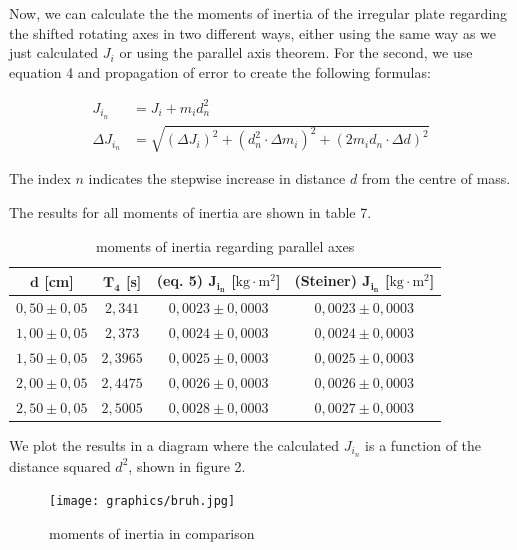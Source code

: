 \documentclass{article}
\begin{document}
Now, we can calculate the the moments of inertia of the irregular plate regarding the shifted rotating axes in two different ways, either using the same way as we just calculated $J_i$ or using the parallel axis theorem. For the second, we use equation 4 and propagation of error to create the following formulas:

\begin{equation}
\begin{split}
    J_{i_n} &= J_i + m_i d_n^2 \\
    \Delta J_{i_n} &= \sqrt{(\Delta J_i)^2 + (d_n^2 \cdot \Delta m_i)^2 + (2m_id_n \cdot \Delta d)^2}
\end{split}
\end{equation}

The index $n$ indicates the stepwise increase in distance $d$ from the centre of mass.

The results for all moments of inertia are shown in table 7.

\begin{table}[!ht]
    \centering
    \begin{tabular}{c|c|c|c}
        $\bm{d}$ [cm] & $\bm{T_4}$ [s] & \textbf{(eq. 5)} $\bm{J_{i_n}}$ [$\text{kg} \cdot \text{m}^2$] & \textbf{(Steiner)} $\bm{J_{i_n}}$ [$\text{kg} \cdot \text{m}^2$] \\ \hline
        $0,50 \pm 0,05$ & $2,341$ & $0,0023 \pm 0,0003$ & $0,0023 \pm 0,0003$ \\ 
        $1,00 \pm 0,05$ & $2,373$ & $0,0024 \pm 0,0003$ & $0,0024 \pm 0,0003$ \\ 
        $1,50 \pm 0,05$ & $2,3965$ & $0,0025 \pm 0,0003$ & $0,0025 \pm 0,0003$ \\ 
        $2,00 \pm 0,05$ & $2,4475$ & $0,0026 \pm 0,0003$ & $0,0026 \pm 0,0003$ \\ 
        $2,50 \pm 0,05$ & $2,5005$ & $0,0028 \pm 0,0003$ & $0,0027 \pm 0,0003$ \\ 
    \end{tabular}
    \caption{moments of inertia regarding parallel axes}
    \bigskip
\end{table}

We plot the results in a diagram where the calculated ${J_{i_n}}$ is a function of the distance squared $d^2$, shown in figure 2.

\begin{figure} [!hb]
    \centering
    \texttt{[image: graphics/bruh.jpg]}
    \caption{moments of inertia in comparison}
\end{figure}
\end{document}
